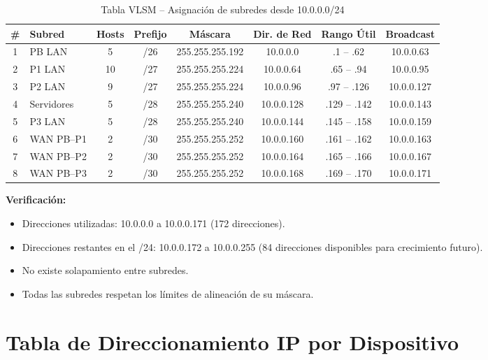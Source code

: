 \documentclass[letterpaper,11pt]{article}
\begin{document}
\begin{table}[H]
\centering
\caption{Tabla VLSM -- Asignación de subredes desde 10.0.0.0/24}
\label{tab:vlsm_completa}
\small
\renewcommand{\arraystretch}{1.3}
\begin{tabular}{|c|l|c|c|c|c|c|c|}
\hline
\textbf{\#} & \textbf{Subred} & \textbf{Hosts} & \textbf{Prefijo} & \textbf{Máscara} & \textbf{Dir. de Red} & \textbf{Rango Útil} & \textbf{Broadcast} \\
\hline
1 & PB LAN & 5 & /26 & 255.255.255.192 & 10.0.0.0 & .1 -- .62 & 10.0.0.63 \\
\hline
2 & P1 LAN & 10 & /27 & 255.255.255.224 & 10.0.0.64 & .65 -- .94 & 10.0.0.95 \\
\hline
3 & P2 LAN & 9 & /27 & 255.255.255.224 & 10.0.0.96 & .97 -- .126 & 10.0.0.127 \\
\hline
4 & Servidores & 5 & /28 & 255.255.255.240 & 10.0.0.128 & .129 -- .142 & 10.0.0.143 \\
\hline
5 & P3 LAN & 5 & /28 & 255.255.255.240 & 10.0.0.144 & .145 -- .158 & 10.0.0.159 \\
\hline
6 & WAN PB--P1 & 2 & /30 & 255.255.255.252 & 10.0.0.160 & .161 -- .162 & 10.0.0.163 \\
\hline
7 & WAN PB--P2 & 2 & /30 & 255.255.255.252 & 10.0.0.164 & .165 -- .166 & 10.0.0.167 \\
\hline
8 & WAN PB--P3 & 2 & /30 & 255.255.255.252 & 10.0.0.168 & .169 -- .170 & 10.0.0.171 \\
\hline
\end{tabular}
\end{table}

\textbf{Verificación:}
\begin{itemize}
    \item Direcciones utilizadas: 10.0.0.0 a 10.0.0.171 (172 direcciones).
    \item Direcciones restantes en el /24: 10.0.0.172 a 10.0.0.255 (84 direcciones disponibles para crecimiento futuro).
    \item No existe solapamiento entre subredes.
    \item Todas las subredes respetan los límites de alineación de su máscara.
\end{itemize}

\section{Tabla de Direccionamiento IP por Dispositivo}
\end{document}
